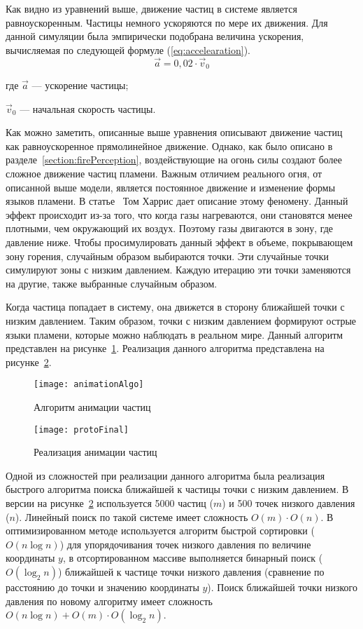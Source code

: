 Как видно из уравнений выше, движение частиц в системе является равноускоренным.
Частицы немного ускоряются по мере их движения. Для данной симуляции была
эмпирически подобрана величина ускорения, вычисляемая по следующей формуле
(\ref{eq:accelearation}).
\begin{equation}
  \label{eq:accelearation}
  \vec{a} = 0,02 \cdot \vec{v}_{0}
\end{equation}
\begin{explanationx}
    \item [где] $\vec{a}$ --- ускорение частицы;
    \item $\vec{v}_{0}$ --- начальная скорость частицы.
\end{explanationx}

Как можно заметить, описанные выше уравнения описывают движение частиц как
равноускоренное прямолинейное движение. Однако, как было описано в
разделе~\ref{section:firePerception}, воздействующие на огонь силы создают более
сложное движение частиц пламени. Важным отличием реального огня, от описанной
выше модели, является постоянное движение и изменение формы языков пламени. В
статье~\cite{Harris} Том Харрис дает описание этому феномену. Данный эффект
происходит из-за того, что когда газы нагреваются, они становятся менее
плотными, чем окружающий их воздух. Поэтому газы двигаются в зону, где давление
ниже. Чтобы просимулировать данный эффект в объеме, покрывающем зону горения,
случайным образом выбираются точки. Эти случайные точки симулируют зоны с
низким давлением. Каждую итерацию эти точки заменяются на другие, также
выбранные случайным образом.

Когда частица попадает в систему, она движется в сторону ближайшей точки с
низким давлением. Таким образом, точки с низким давлением формируют острые языки
пламени, которые можно наблюдать в реальном мире. Данный алгоритм представлен на
рисунке~\ref{fig:animationAlgo}. Реализация данного алгоритма представлена на
рисунке~\ref{fig:protoFinal}.
\begin{figure}[htb]
	\centering
    \texttt{[image: animationAlgo]}
    \caption{Алгоритм анимации частиц}%
    \label{fig:animationAlgo}
\end{figure}
\begin{figure}[htb]
	\centering
    \texttt{[image: protoFinal]}
    \caption{Реализация анимации частиц}%
    \label{fig:protoFinal}
\end{figure}

Одной из сложностей при реализации данного алгоритма была реализация быстрого
алгоритма поиска ближайшей к частицы точки с низким давлением. В версии на
рисунке~\ref{fig:protoFinal} используется 5000 частиц ($m$) и 500 точек низкого
давления ($n$). Линейный поиск по такой системе имеет сложность
$O(m) \cdot O(n)$.
В оптимизированном методе используется алгоритм быстрой сортировки
($O(n \log n)$) для упорядочивания точек низкого давления по величине
координаты $y$, в отсортированном массиве выполняется бинарный поиск
($O(\log_{2} n)$) ближайшей к частице точки низкого давления (сравнение по
расстоянию до точки и значению координаты $y$). Поиск ближайшей точки низкого
давления по новому алгоритму имеет сложность
$O(n \log n) + O(m) \cdot O(\log_{2} n)$.

